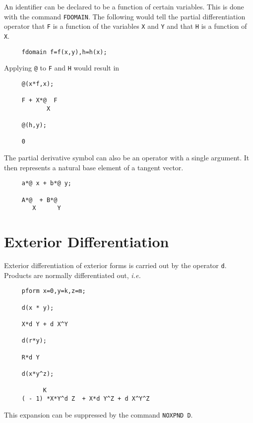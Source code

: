 An identifier can be declared to be a function of certain variables.
This is done with the command {\tt FDOMAIN}\label{FDOMAIN}.  The
following would tell the partial differentiation operator that {\tt F}
is a function of the variables {\tt X} and {\tt Y} and that {\tt H} is
a function of {\tt X}.

\begin{verbatim}
     fdomain f=f(x,y),h=h(x);
\end{verbatim}

Applying {\tt @} to {\tt F} and {\tt H} would result in

\begin{verbatim}
     @(x*f,x);

     F + X*@  F
            X

     @(h,y);

     0
\end{verbatim}

The partial derivative symbol can also be an operator with a single
argument.  It then represents a natural base element of a tangent
vector\label{at1}.

\example{}

\begin{verbatim}
     a*@ x + b*@ y;

     A*@  + B*@
        X      Y
\end{verbatim}

\section{Exterior Differentiation}
Exterior differentiation of exterior forms is carried out by the
operator {\tt d}\label{d}.  Products are normally differentiated out,
{\em i.e.}

\begin{verbatim}
     pform x=0,y=k,z=m;

     d(x * y);

     X*d Y + d X^Y

     d(r*y);

     R*d Y

     d(x*y^z);

           K
     ( - 1) *X*Y^d Z  + X*d Y^Z + d X^Y^Z
\end{verbatim}

This expansion can be suppressed by the command {\tt NOXPND D}\label{NOXPNDD}.

